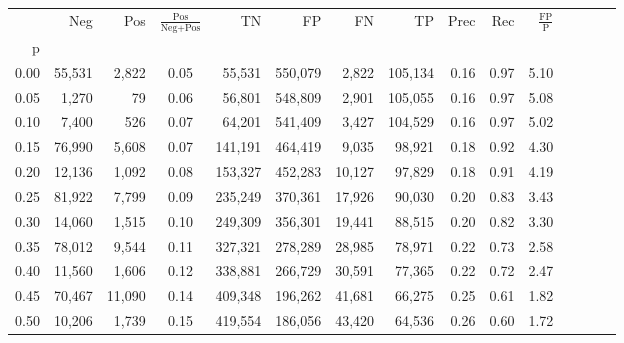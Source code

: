 \begin{tabular}{rrrcrrrrrrrrrrr}
\toprule
{} &     Neg &     Pos & $\frac{\text{Pos}}{\text{Neg}+\text{Pos}}$ &       TN &       FP &       FN &       TP &  Prec &   Rec & $\frac{\text{FP}}{\text{P}}$ \\
p    &         &         &                                            &          &          &          &          &       &       &                              \\
\midrule
0.00 &  55,531 &   2,822 &                                       0.05 &   55,531 &  550,079 &    2,822 &  105,134 &  0.16 &  0.97 &                         5.10 \\
0.05 &   1,270 &      79 &                                       0.06 &   56,801 &  548,809 &    2,901 &  105,055 &  0.16 &  0.97 &                         5.08 \\
0.10 &   7,400 &     526 &                                       0.07 &   64,201 &  541,409 &    3,427 &  104,529 &  0.16 &  0.97 &                         5.02 \\
0.15 &  76,990 &   5,608 &                                       0.07 &  141,191 &  464,419 &    9,035 &   98,921 &  0.18 &  0.92 &                         4.30 \\
0.20 &  12,136 &   1,092 &                                       0.08 &  153,327 &  452,283 &   10,127 &   97,829 &  0.18 &  0.91 &                         4.19 \\
0.25 &  81,922 &   7,799 &                                       0.09 &  235,249 &  370,361 &   17,926 &   90,030 &  0.20 &  0.83 &                         3.43 \\
0.30 &  14,060 &   1,515 &                                       0.10 &  249,309 &  356,301 &   19,441 &   88,515 &  0.20 &  0.82 &                         3.30 \\
0.35 &  78,012 &   9,544 &                                       0.11 &  327,321 &  278,289 &   28,985 &   78,971 &  0.22 &  0.73 &                         2.58 \\
0.40 &  11,560 &   1,606 &                                       0.12 &  338,881 &  266,729 &   30,591 &   77,365 &  0.22 &  0.72 &                         2.47 \\
0.45 &  70,467 &  11,090 &                                       0.14 &  409,348 &  196,262 &   41,681 &   66,275 &  0.25 &  0.61 &                         1.82 \\
0.50 &  10,206 &   1,739 &                                       0.15 &  419,554 &  186,056 &   43,420 &   64,536 &  0.26 &  0.60 &                         1.72 \\

\end{tabular}

